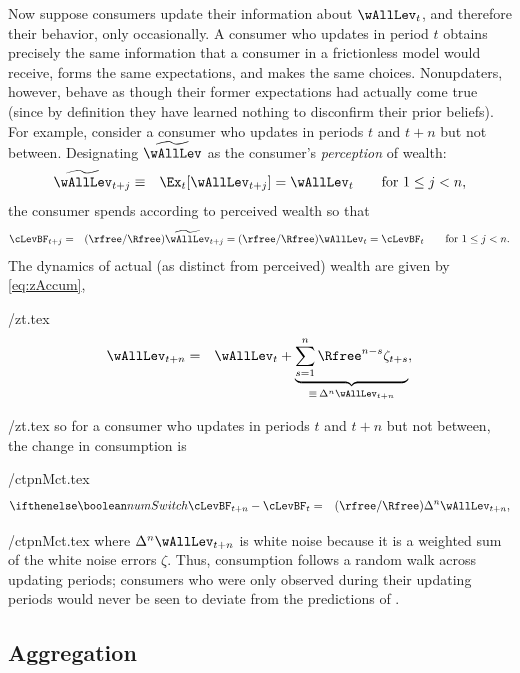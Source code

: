 \documentclass[titlepage]{\econtex}
\begin{document}
Now suppose consumers update their information about $\wAllLev_t$, and therefore their behavior, only occasionally.  A consumer who updates in period $t$ obtains precisely the same information that a consumer in a frictionless model would receive, forms the same expectations, and makes the same choices.  Nonupdaters, however, behave as though their former expectations had actually come true (since by definition they have learned nothing to disconfirm their prior beliefs).  For example, consider a consumer who updates in periods $t$ and $t+n$ but not between.  Designating $\perc{\wAllLev}$ as the consumer's {\it perception} of wealth:
  \begin{eqnarray*}
\perc{\wAllLev}_{t+j} & \equiv & \Ex_{t}[\wAllLev_{t+j}] = \wAllLev_{t} \qquad \text{for }  1\le j < n,
\end{eqnarray*}
  the consumer spends according to perceived wealth so that
  \begin{eqnarray*}
\cLevBF_{t+j} & = & (\rfree/\Rfree)\perc{\wAllLev}_{t+j} = (\rfree/\Rfree)     \wAllLev _{t} = \cLevBF_{t} \qquad \text{for }  1\le j < n.
\end{eqnarray*}
The dynamics of actual (as distinct from perceived) wealth are given by \eqref{eq:zAccum},
\begin{verbatimwrite}{\eq/zt.tex}
\begin{eqnarray*}
 \wAllLev_{t+n} & = & \wAllLev_{t}+\underbrace{\sum_{s=1}^{n} \Rfree^{n-s}\zeta_{t+s}}_{\equiv\,\Delta^{n} \wAllLev_{t+n}},
\end{eqnarray*}
\end{verbatimwrite}
 \eq/zt.tex
so for a consumer who updates in periods $t$ and $t+n$ but not between, the change in consumption is
\begin{verbatimwrite}{\eq/ctpnMct.tex}
\begin{eqnarray*}
\ifnumSw        \cLevBF_{t+n}-\cLevBF_{t}  & = & (\rfree/\Rfree)\Delta^{n}\wAllLev_{t+n},
\end{eqnarray*}
\end{verbatimwrite}
 {\eq/ctpnMct.tex} where $\Delta^{n}\wAllLev_{t+n}$ is white noise because it is a weighted sum of the white noise errors $\zeta$.  Thus, consumption follows a random walk across updating periods; consumers who were only observed during their updating periods would never be seen to deviate from the predictions of \cite{hallRandomWalk}.


\subsection{Aggregation}
\end{document}
